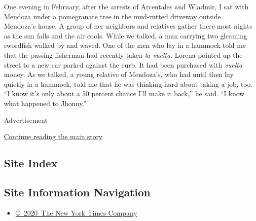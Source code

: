 One evening in February, after the arrests of Arcentales and Wladmir, I
sat with Mendoza under a pomegranate tree in the mud-rutted driveway
outside Mendoza's house. A group of her neighbors and relatives gather
there most nights as the sun falls and the air cools. While we talked, a
man carrying two gleaming swordfish walked by and waved. One of the men
who lay in a hammock told me that the passing fisherman had recently
taken \emph{la vuelta.} Lorena pointed up the street to a new car parked
against the curb. It had been purchased with \emph{vuelta} money. As we
talked, a young relative of Mendoza's, who had until then lay quietly in
a hammock, told me that he was thinking hard about taking a job, too.
``I know it's only about a 50 percent chance I'll make it back,'' he
said. ``I know what happened to Jhonny.''

Advertisement

\protect\hyperlink{after-bottom}{Continue reading the main story}

\hypertarget{site-index}{%
\subsection{Site Index}\label{site-index}}

\hypertarget{site-information-navigation}{%
\subsection{Site Information
Navigation}\label{site-information-navigation}}

\begin{itemize}
\tightlist
\item
  \href{https://help.nytimes3xbfgragh.onion/hc/en-us/articles/115014792127-Copyright-notice}{©~2020~The
  New York Times Company}
\end{itemize}

